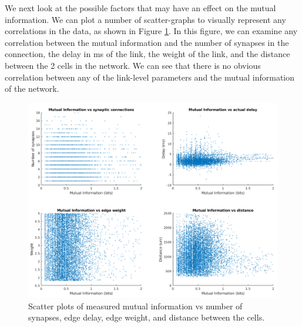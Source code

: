 

We next look at the possible factors that may have an effect on the mutual information. We can plot a number of scatter-graphs to visually represent any correlations in the data, as shown in Figure \ref{fig:mInfoCorrGraph}. In this figure, we can examine any correlation between the mutual information and the number of synapses in the connection, the delay in ms of the link, the weight of the link, and the distance between the 2 cells in the network. We can see that there is no obvious correlation between any of the link-level parameters and the mutual information of the network.\\
\begin{figure}[ht]
    \includegraphics[width=\textwidth]{05-Results/minfoCorrPlot.png}
    \caption{Scatter plots of measured mutual information vs number of synapses, edge delay, edge weight, and distance between the cells.}
    \label{fig:mInfoCorrGraph}
\end{figure}
